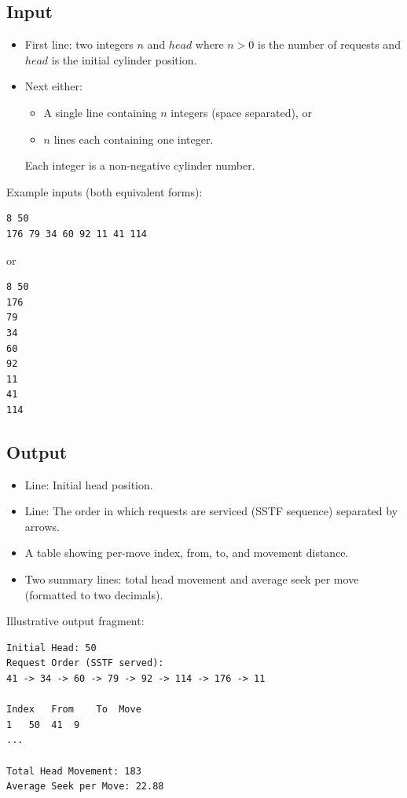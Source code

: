 \documentclass[12pt,a4paper]{article}
\begin{document}
\subsection*{Input}
\begin{itemize}
  \item First line: two integers $n$ and $head$ where $n>0$ is the number of requests and $head$ is the initial cylinder position.
  \item Next either:
    \begin{itemize}
      \item A single line containing $n$ integers (space separated), or
      \item $n$ lines each containing one integer.
    \end{itemize}
  Each integer is a non-negative cylinder number.
\end{itemize}

Example inputs (both equivalent forms):
\begin{verbatim}
8 50
176 79 34 60 92 11 41 114
\end{verbatim}
or
\begin{verbatim}
8 50
176
79
34
60
92
11
41
114
\end{verbatim}

\subsection*{Output}
\begin{itemize}
  \item Line: Initial head position.
  \item Line: The order in which requests are serviced (SSTF sequence) separated by arrows.
  \item A table showing per-move index, from, to, and movement distance.
  \item Two summary lines: total head movement and average seek per move (formatted to two decimals).
\end{itemize}

Illustrative output fragment:
\begin{verbatim}
Initial Head: 50
Request Order (SSTF served):
41 -> 34 -> 60 -> 79 -> 92 -> 114 -> 176 -> 11

Index	From	To	Move
1	50	41	9
...

Total Head Movement: 183
Average Seek per Move: 22.88
\end{verbatim}
\end{document}
